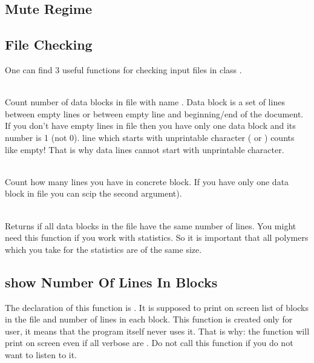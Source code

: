 \documentclass[12pt]{article}
\begin{document}
\begin{mySection}
\subsection{Mute Regime}
\subsection{File Checking}
One can find 3 useful functions for checking input files in class .

\\
Count number of data blocks in file with name . Data block is a set of lines between empty lines or between empty line and beginning/end of the document. If you don't have empty lines in file then you have only one data block and its number is 1 (not 0).
\important line which starts with unprintable character ( or ) counts like empty! That is why data lines cannot start with unprintable character.

\\
Count how many lines you have in concrete block. If you have only one data block in file you can scip the second argument).

\\
Returns  if all data blocks in the file have the same number of lines. You might need this function if you work with statistics. So it is important that all polymers which you take for the statistics are of the same size.

\subsection{show Number Of Lines In Blocks}\label{sec:linesInBlocks}
The declaration of this function is . 
It is supposed to print on screen list of blocks in the file and number of lines in each block. This function is created only for user, it means that the program itself never uses it. That is why:
\important the function will print on screen even if all verbose are . Do not call this function if you do not want to listen to it.


\end{mySection}

\end{document}
